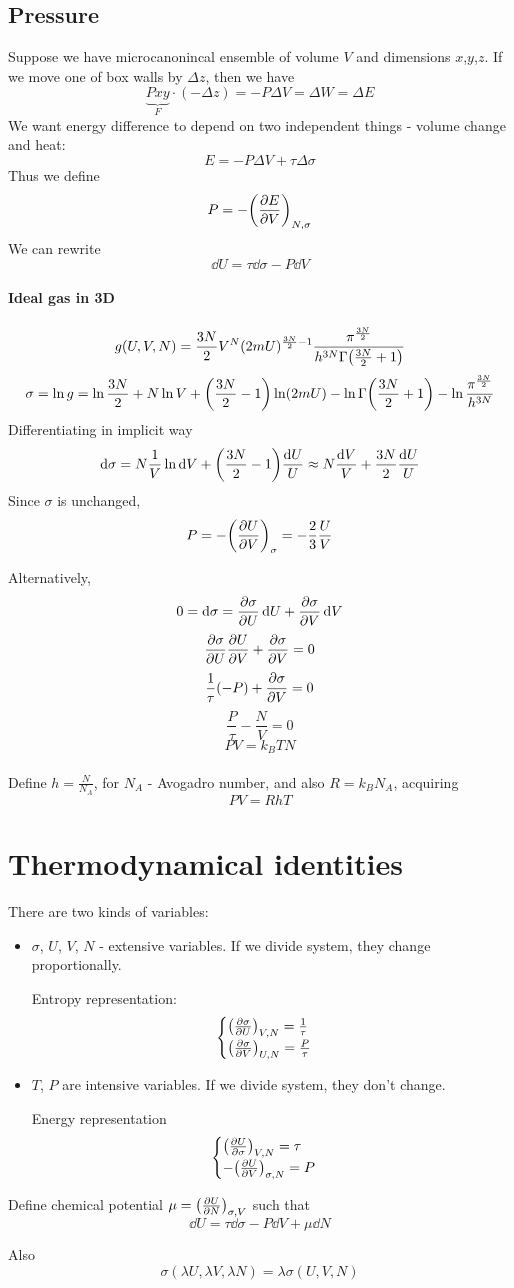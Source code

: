 \subsection{Pressure}
Suppose we have microcanonincal ensemble of volume $V$ and dimensions $x$,$y$,$z$. If we move one of box walls by $\Delta z$, then we have
$$\underbrace{Pxy}_{F} \cdot (-\Delta z )= -P \Delta V  =\Delta W = \Delta E$$
We want energy difference to depend on two independent things - volume change and heat:
$$E = -P\Delta V + \tau \Delta \sigma$$
Thus we define
$$ P = - \qty(\pdv{E}{V})_{N, \sigma}$$ 
We can rewrite
$$\dd{U} = \tau\dd{\sigma} - P\dd{V}$$
\paragraph{Ideal gas in 3D}
$$g(U,V,N) = \frac{3N}{2} V^N (2mU)^{\frac{3N}{2}-1} \frac{\pi^{\frac{3N}{2}}}{h^{3N} \Gamma\qty(\frac{3N}{2}+1)} $$
\begin{align*}
\sigma = \ln g = \ln \frac{3N}{2} + N\ln V + \qty(\frac{3N}{2}-1)\ln (2mU) - \ln \Gamma\qty(\frac{3N}{2}+1) - \ln \frac{\pi^{\frac{3N}{2}}}{h^{3N}}
\end{align*}
Differentiating in implicit way
$$\dd{\sigma} = N \frac{1}{V} \ln \dd{V} +  \qty(\frac{3N}{2}-1)\frac{\dd{U}}{U} \approx N\frac{\dd{V}}{V} + \frac{3N}{2}\frac{\dd{U}}{U}$$
Since $\sigma$ is unchanged,
$$P = -\qty(\pdv{U}{V})_{\sigma} = -\frac{2}{3}\frac{U}{V}$$


Alternatively,
$$0 =\dd{\sigma} = \pdv{\sigma}{U}\dd{U} + \pdv{\sigma}{V} \dd{V}$$
$$\pdv{\sigma}{U} \pdv{U}{V} + \pdv{\sigma}{V} = 0$$
$$\frac{1}{\tau} (-P) + \pdv{\sigma}{V} = 0$$
$$\frac{P}{\tau} - \frac{N}{V} = 0$$
$$PV = k_B TN$$

\paragraph{}
Define $h = \frac{N}{N_A}$, for $N_A$ - Avogadro number, and also $R  = k_B N_A$, acquiring
$$PV = RhT$$
\section{Thermodynamical identities}
There are two kinds of variables: 
\begin{itemize}
	\item $\sigma$, $U$, $V$, $N$ - extensive variables. If we divide system, they change proportionally.
	
	Entropy representation:
	$$\begin{cases}
	\qty(\pdv{\sigma}{U})_{V,N} = \frac{1}{\tau}\\
	\qty(\pdv{\sigma}{V})_{U,N} = \frac{P}{\tau}
	\end{cases}$$
	\item $T$, $P$ are intensive variables. If we divide system, they don't change.
	
	Energy representation
	$$\begin{cases}
	\qty(\pdv{U}{\sigma})_{V, N} = \tau\\
	-\qty(\pdv{U}{V})_{\sigma, N} = P
	\end{cases}$$
\end{itemize}

Define chemical potential $\mu=\qty(\pdv{U}{N})_{\sigma, V}$ such that
$$\dd{U} = \tau \dd{\sigma} - P \dd{V} + \mu\dd{N}$$

Also
$$\sigma(\lambda U, \lambda V, \lambda N) = \lambda \sigma ( U,  V,  N) $$